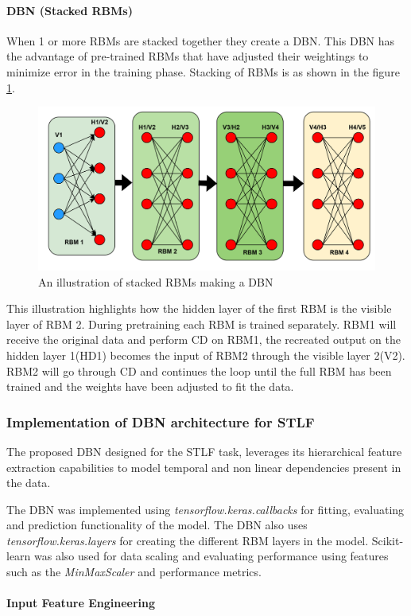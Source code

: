\paragraph{DBN (Stacked RBMs)} When 1 or more RBMs are stacked together they create a DBN. This DBN has the advantage of pre-trained RBMs that have adjusted their weightings to minimize error in the training phase. Stacking of RBMs is as shown in the figure \ref{fig:correctrbm}.
\begin{figure}[h]
	\centering
	\includegraphics[width=0.7\linewidth]{Chapters/images/CORRECT_RBM}
	\caption{An illustration of stacked RBMs making a DBN}
	\label{fig:correctrbm}
\end{figure} 
This illustration highlights how the hidden layer of the first RBM is the visible layer of RBM 2. During pretraining each RBM is trained separately. RBM1 will receive the original data and perform CD on RBM1, the recreated output on the hidden layer 1(HD1) becomes the input of RBM2 through the visible layer 2(V2). RBM2 will go through CD and continues the loop until the full RBM has been trained and the weights have been adjusted to fit the data.

\subsubsection{Implementation of DBN architecture for STLF}
The proposed DBN designed for the STLF task, leverages its hierarchical feature extraction capabilities to model temporal and non linear dependencies present in the data.

The DBN was implemented using \textit{tensorflow.keras.callbacks} for fitting, evaluating and prediction functionality of the model. The DBN also uses \textit{tensorflow.keras.layers} for creating the different RBM layers in the model. Scikit-learn was also used for data scaling and evaluating performance using features such as the \textit{MinMaxScaler} and performance metrics. \\ 

\paragraph{Input Feature Engineering}

